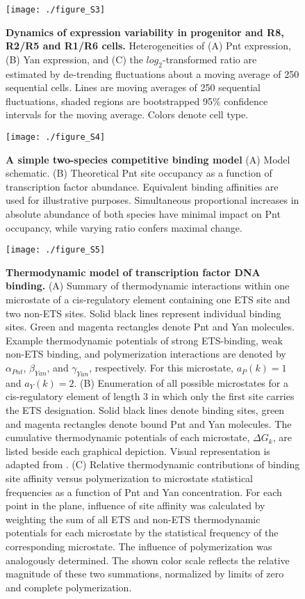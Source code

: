 \begin{figure}[h]
\centering
\texttt{[image: ./figure\_S3]}
\caption[Dynamics of expression variability in progenitors and R8, R2/R5 and R1/R6 cells.]{\textbf{Dynamics of expression variability in progenitor and R8, R2/R5 and R1/R6 cells.} Heterogeneities of (A) Pnt expression, (B) Yan expression, and (C) the $log_2$-transformed ratio are estimated by de-trending fluctuations about a moving average of 250 sequential cells. Lines are moving averages of 250 sequential fluctuations, shaded regions are bootstrapped 95\% confidence intervals for the moving average. Colors denote cell type.}
\label{fig:ratio:figS3}
\end{figure}

\begin{figure}[h]
\centering
\texttt{[image: ./figure\_S4]}
\caption[A simple two-species competitive binding model]{\textbf{A simple two-species competitive binding model} (A) Model schematic. (B) Theoretical Pnt site occupancy as a function of transcription factor abundance. Equivalent binding affinities are used for illustrative purposes. Simultaneous proportional increases in absolute abundance of both species have minimal impact on Pnt occupancy, while varying ratio confers maximal change.}
\label{fig:ratio:figS4}
\end{figure}

\begin{figure}[h]
\centering
\texttt{[image: ./figure\_S5]}
\caption[Thermodynamic model of transcription factor DNA binding.]{\textbf{Thermodynamic model of transcription factor DNA binding.} (A) Summary of thermodynamic interactions within one microstate of a cis-regulatory element containing one ETS site and two non-ETS sites. Solid black lines represent individual binding sites. Green and magenta rectangles denote Pnt and Yan molecules. Example thermodynamic potentials of strong ETS-binding, weak non-ETS binding, and polymerization interactions are denoted by $\alpha_{Pnt}$, $\beta_{Yan}$, and $\gamma_{Yan}$, respectively. For this microstate, $a_P(k)=1$ and $a_Y(k)=2$. (B) Enumeration of all possible microstates for a cis-regulatory element of length 3 in which only the first site carries the ETS designation. Solid black lines denote binding sites, green and magenta rectangles denote bound Pnt and Yan molecules. The cumulative thermodynamic potentials of each microstate, $\Delta G_k$, are listed beside each graphical depiction. Visual representation is adapted from \cite{Hope2017}. (C) Relative thermodynamic contributions of binding site affinity versus polymerization to microstate statistical frequencies as a function of Pnt and Yan concentration. For each point in the plane, influence of site affinity was calculated by weighting the sum of all ETS and non-ETS thermodynamic potentials for each microstate by the statistical frequency of the corresponding microstate. The influence of polymerization was analogously determined. The shown color scale reflects the relative magnitude of these two summations, normalized by limits of zero and complete polymerization.}
\label{fig:ratio:figS5}
\end{figure}

